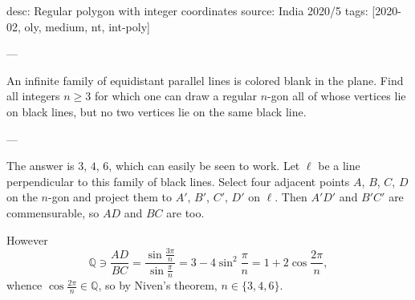 desc: Regular polygon with integer coordinates
source: India 2020/5
tags: [2020-02, oly, medium, nt, int-poly]

---

An infinite family of equidistant parallel lines is colored blank in the plane. Find all integers $n\ge3$ for which one can draw a regular $n$-gon all of whose vertices lie on black lines, but no two vertices lie on the same black line.

---

The answer is $3$, $4$, $6$, which can easily be seen to work. Let $\ell$ be a line perpendicular to this family of black lines. Select four adjacent points $A$, $B$, $C$, $D$ on the $n$-gon and project them to $A'$, $B'$, $C'$, $D'$ on $\ell$. Then $A'D'$ and $B'C'$ are commensurable, so $AD$ and $BC$ are too.

However \[\mathbb Q\ni\frac{AD}{BC}=\frac{\sin\frac{3\pi}n}{\sin\frac{\pi}n}=3-4\sin^2\frac{\pi}n=1+2\cos\frac{2\pi}n,\]
whence $\cos\tfrac{2\pi}n\in\mathbb Q$, so by Niven's theorem, $n\in\{3,4,6\}$.
